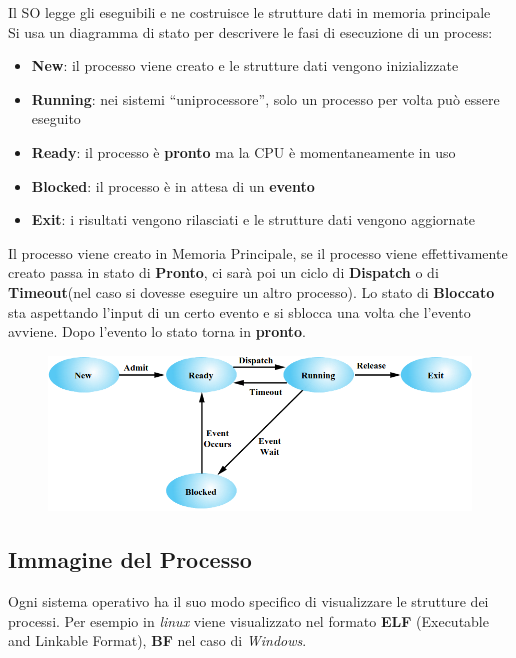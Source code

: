 \documentclass[12pt, a4paper]{article}
\begin{document}
	
	Il SO legge gli eseguibili e ne costruisce le strutture dati in memoria principale \\
	Si usa un diagramma di stato per descrivere le fasi di esecuzione di un process:
	\begin{itemize}
		\item \textbf{New}: il processo viene creato e le strutture dati vengono inizializzate	
		
		\item \textbf{Running}: nei sistemi ``uniprocessore'', solo un processo per volta può essere eseguito
		
		\item \textbf{Ready}: il processo è \textbf{pronto} ma la CPU è momentaneamente in uso
		 
		\item \textbf{Blocked}: il processo è in attesa di un \textbf{evento}
		
		\item \textbf{Exit}: i risultati vengono rilasciati e le strutture dati vengono aggiornate
	\end{itemize}
	Il processo viene creato in Memoria Principale, se il processo viene effettivamente creato passa in stato di \textbf{Pronto}, ci sarà poi un ciclo di \textbf{Dispatch} o di \textbf{Timeout}(nel caso si dovesse eseguire un altro processo). Lo stato di \textbf{Bloccato} sta aspettando l'input di un certo evento e si sblocca una volta che l'evento avviene. Dopo l'evento lo stato torna in \textbf{pronto}.
	
	\begin{figure}[!htbp]
		\centering
		\includegraphics[width=14.5cm]{SO_PNGs/five-state-process-model_SO.png}
		\caption*{}
		\label{fig:five-state-model}
	\end{figure}

	\newpage
	
	
	\subsection*{Immagine del Processo} 
	Ogni sistema operativo ha il suo modo specifico di visualizzare le strutture dei processi. Per esempio in \textit{linux} viene visualizzato nel formato \textbf{ELF} (Executable and Linkable Format), \textbf{BF} nel caso di \textit{Windows}.
	
\end{document}
